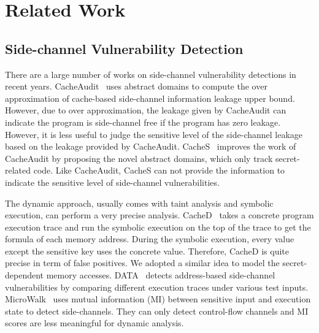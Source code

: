 \section{Related Work}


\subsection{Side-channel Vulnerability Detection}

There are a large number of works on side-channel vulnerability detections in recent years.
CacheAudit~\cite{182946} uses abstract domains to compute the over approximation of cache-based
side-channel information leakage upper bound. However, due to over approximation, the leakage
given by CacheAudit can indicate the program is side-channel free if the program has zero leakage. 
However, it is less useful to judge the sensitive level of the side-channel leakage based on the
leakage provided by CacheAudit. CacheS~\cite{236338} improves the work of CacheAudit by proposing 
the novel abstract domains, which only track secret-related code. Like CacheAudit, CacheS
can not provide the information to indicate the sensitive level of side-channel vulnerabilities.

The dynamic approach, usually comes with taint analysis and symbolic execution, can perform a very 
precise analysis. CacheD~\cite{203878} takes a concrete program execution trace and run the symbolic
execution on the top of the trace to get the formula of each memory address. During the symbolic
execution, every value except the sensitive key uses the concrete value. Therefore, CacheD is quite 
precise in term of false positives. We adopted a similar idea to model the secret-dependent memory 
accesses. DATA~\cite{217537} detects address-based side-channel vulnerabilities by comparing 
different execution traces under various test inputs. MicroWalk~\cite{Wichelmann:2018:MFF:3274694.3274741}
uses mutual information (MI) between sensitive input and execution state to detect
side-channels. They can only detect control-flow channels and MI scores are
less meaningful for dynamic analysis. 

